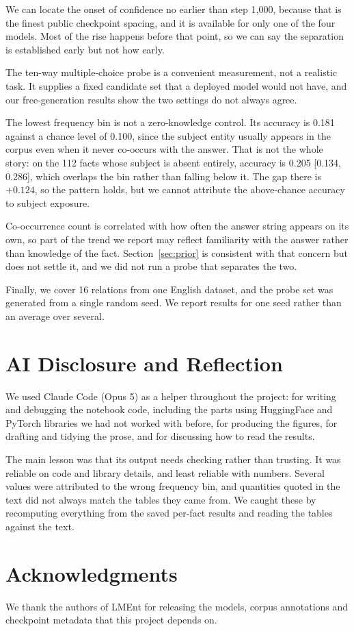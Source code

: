 \documentclass[11pt]{article}
\begin{document}
We can locate the onset of confidence no earlier than step 1{,}000, because that is the finest
public checkpoint spacing, and it is available for only one of the four models. Most of the rise
happens before that point, so we can say the separation is established early but not how early.

The ten-way multiple-choice probe is a convenient measurement, not a realistic task. It supplies
a fixed candidate set that a deployed model would not have, and our free-generation results show
the two settings do not always agree.

The lowest frequency bin is not a zero-knowledge control. Its accuracy is 0.181 against a chance
level of 0.100, since the subject entity usually appears in the corpus even when it never
co-occurs with the answer. That is not the whole story: on the 112 facts whose subject is absent
entirely, accuracy is 0.205 [0.134, 0.286], which overlaps the bin rather than falling below it.
The gap there is $+0.124$, so the pattern holds, but we cannot attribute the above-chance
accuracy to subject exposure.

Co-occurrence count is correlated with how often the answer string appears on its own, so part
of the trend we report may reflect familiarity with the answer rather than knowledge of the
fact. Section~\ref{sec:prior} is consistent with that concern but does not settle it, and we
did not run a probe that separates the two.

Finally, we cover 16 relations from one English dataset, and the probe set was generated from a
single random seed. We report results for one seed rather than an average over several.

\section*{AI Disclosure and Reflection}

We used Claude Code (Opus 5) as a helper throughout the project: for writing and debugging the
notebook code, including the parts using HuggingFace and PyTorch libraries we had not worked with
before, for producing the figures, for drafting and tidying the prose, and for discussing how to
read the results.

The main lesson was that its output needs checking rather than trusting. It was reliable on code
and library details, and least reliable with numbers. Several values were attributed to the wrong
frequency bin, and quantities quoted in the text did not always match the tables they came from.
We caught these by recomputing everything from the saved per-fact results and reading the tables
against the text.

\section*{Acknowledgments}

We thank the authors of LMEnt for releasing the models, corpus annotations and checkpoint
metadata that this project depends on.


\end{document}
